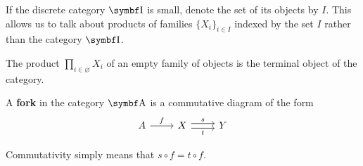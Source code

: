 \begin{note}\label{note:small_categorical_product}
  If the discrete category \( \Bold I \) is small, denote the set of its objects by \( I \). This allows us to talk about products of families \( \{ X_i \}_{i \in I} \) indexed by the set \( I \) rather than the category \( \Bold I \).
\end{note}

\begin{note}\label{note:empty_categorical_product}
  The product \( \prod_{i \in \varnothing} X_i \) of an empty family of objects is the terminal object of the category.
\end{note}

\begin{definition}\label{def:categorical_fork}\cite[112]{Leinster2014}
  A \textbf{fork} in the category \( \Bold A \) is a commutative diagram of the form
  \begin{equation*}
    \begin{tikzcd}
      A \arrow[r, "f"] & X \arrow[r, shift left=1, "s"] \arrow[r, shift right=1, "t"'] & Y
    \end{tikzcd}
  \end{equation*}

  Commutativity simply means that \( s \circ f = t \circ f \).
\end{definition}

